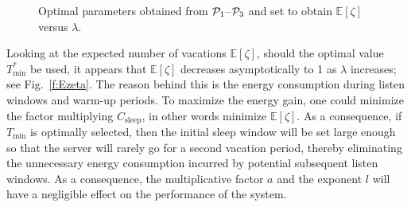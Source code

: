 \documentclass[journal]{IEEEtran}
\def \E{{\mathbb E}}
\begin{document}
\begin{figure}[tb]
\begin{center}
\hspace{1em}
\hspace{1em}

\hspace{1em}
\caption{ Optimal parameters obtained from ${\cal P}_1$--${\cal P}_3$ and set to obtain $\E[\zeta]$ versus $\lambda$. \label{f:Ezeta}\label{f:valuesOptim}}

\end{center}
\end{figure}
Looking at the expected number of vacations $\E[\zeta]$, should the optimal value $T_{\min}^*$ be used,  it appears that $\E[\zeta]$ decreases asymptotically to 1 as $\lambda$ increases; see Fig.~\ref{f:Ezeta}. The reason behind this is the energy consumption during listen windows and warm-up periods. To maximize the energy gain, one could minimize the factor multiplying $C_{\textrm{sleep}}$, in other words minimize 
$\E[\zeta]$. As a consequence, if $T_{\min}$ is optimally selected, then the initial sleep window will be set large enough so that the server will rarely go for a second vacation period, thereby eliminating the unnecessary energy consumption incurred by potential subsequent listen windows. As a consequence, the multiplicative factor $a$ and the exponent $l$ will have a negligible effect on the performance of the system.
\end{document}
